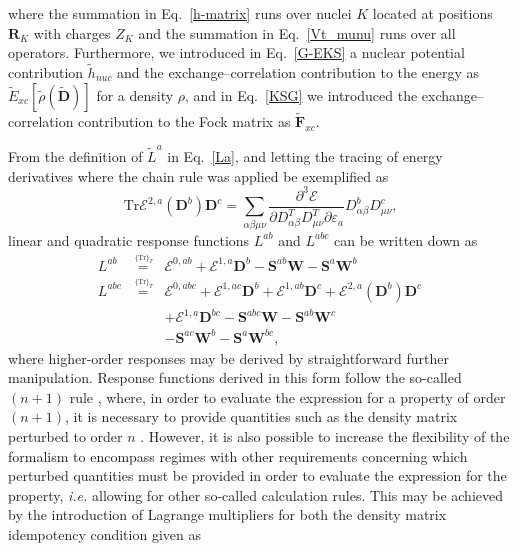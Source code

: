 \documentclass[%
 reprint,
 amsmath,amssymb,
 aps,
]{revtex4-1}
\begin{document}
where the summation in Eq.~\eqref{h-matrix} runs over nuclei $K$ located at positions $\mathbf{R}_{K}$ with charges $Z_{K}$ and the summation in Eq.~\eqref{Vt_munu} runs over all  operators. Furthermore, we introduced in Eq.~\eqref{G-EKS} a nuclear potential contribution $\tilde{h}_{nuc}$ and the exchange--correlation contribution to the energy as $\tilde{E}_{xc}[\tilde{\rho}(\tilde{\mathbf{D}})]$ for a density $\rho$, and in Eq.~\eqref{KSG} we introduced the exchange--correlation contribution to the Fock matrix as $\tilde{\mathbf{F}}_{xc}$.  

From the definition of $\tilde{L}^{a}$ in Eq.~\eqref{La}, and letting the tracing of energy derivatives where the chain rule was applied be exemplified as
\begin{equation}\label{trEchain}
\text{Tr}\mathcal{E}^{2, a}(\mathbf{D}^{b})\mathbf{D}^{c} = \sum_{\alpha \beta \mu \nu} \frac{\partial^{3} \mathcal{E}}{\partial D^{T}_{\alpha \beta} D^{T}_{\mu \nu} \partial \varepsilon_{a}} D^{b}_{\alpha \beta} D^{c}_{\mu \nu} \text{,}
\end{equation}
linear and quadratic response functions $L^{ab}$ and $L^{abc}$ can be written down as
\begin{eqnarray}
L^{ab} & \stackrel{\,^{\{\mathrm{Tr}\}_T}}{=} &  \mathcal{E}^{0,ab}+\bm{\mathcal{E}}^{1,a}\mathbf{D}^{b}-\mathbf{S}^{ab}\mathbf{W}-\mathbf{S}^{a}\mathbf{W}^{b}\label{QagraD}\\
L^{abc} & \stackrel{\,^{\{\mathrm{Tr}\}_T}}{=} &  \mathcal{E}^{0,abc}+\bm{\mathcal{E}}^{1,ac}\mathbf{D}^{b}+\bm{\mathcal{E}}^{1,ab}\mathbf{D}^{c}+\bm{\mathcal{E}}^{2,a}\!(\mathbf{D}^{b})\mathbf{D}^{c}\nonumber \\
 &&+  \bm{\mathcal{E}}^{1,a}\mathbf{D}^{bc}-\mathbf{S}^{abc}\mathbf{W}-\mathbf{S}^{ab}\mathbf{W}^{c} \\ 
&&- \mathbf{S}^{ac}\mathbf{W}^{b}-\mathbf{S}^{a}\mathbf{W}^{bc}\label{QabgraD} \text{,}
\end{eqnarray}
where higher-order responses may be derived by straightforward further manipulation. Response functions derived in this form follow the so-called $(n + 1)$ rule , where, in order to evaluate the expression for a property of order $(n + 1)$, it is necessary to provide quantities such as the density matrix perturbed to order $n$ . However, it is also possible to increase the flexibility of the formalism to encompass regimes with other requirements concerning which perturbed quantities must be provided in order to evaluate the expression for the property, \textit{i.e.} allowing for other so-called calculation rules. This may be achieved by the introduction of Lagrange multipliers for both the density matrix idempotency condition given as
\end{document}
